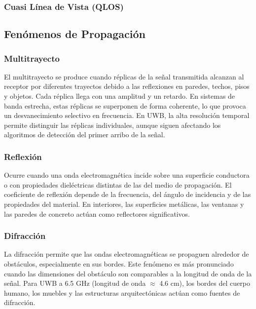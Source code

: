 \subsubsection{Cuasi Línea de Vista (QLOS)}

\subsection{Fenómenos de Propagación}

\subsubsection{Multitrayecto}

El multitrayecto se produce cuando réplicas de la señal transmitida alcanzan al receptor por diferentes trayectos debido a las reflexiones en paredes, techos, pisos y objetos. Cada réplica llega con una amplitud y un retardo. En sistemas de banda estrecha, estas réplicas se superponen de forma coherente, lo que provoca un desvanecimiento selectivo en frecuencia. En UWB, la alta resolución temporal permite distinguir las réplicas individuales, aunque siguen afectando los algoritmos de detección del primer arribo de la señal.

\subsubsection{Reflexión}

Ocurre cuando una onda electromagnética incide sobre una superficie conductora o con propiedades dieléctricas distintas de las del medio de propagación. El coeficiente de reflexión depende de la frecuencia, del ángulo de incidencia y de las propiedades del material. En interiores, las superficies metálicas, las ventanas y las paredes de concreto actúan como reflectores significativos.

\subsubsection{Difracción}

La difracción permite que las ondas electromagnéticas se propaguen alrededor de obstáculos, especialmente en sus bordes. Este fenómeno es más pronunciado cuando las dimensiones del obstáculo son comparables a la longitud de onda de la señal. Para UWB a 6.5 GHz (longitud de onda $\approx$ 4.6 cm), los bordes del cuerpo humano, los muebles y las estructuras arquitectónicas actúan como fuentes de difracción.

